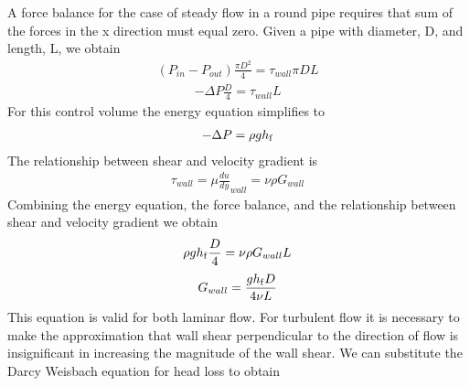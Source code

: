 \documentclass[letterpaper,10pt,english]{sphinxmanual}
\begin{document}
A force balance for the case of steady flow in a round pipe requires that sum of the forces in the x direction must equal zero. Given a pipe with diameter, D, and length, L, we obtain
\begin{equation}\label{equation:Rapid_Mix/RM_Derivations:Rapid_Mix/RM_Derivations:102}
\begin{split}\left(P_{in}- P_{out}\right)\frac{\pi D^2}{4} = \tau_{wall} \pi D L\end{split}
\end{equation}\begin{equation}\label{equation:Rapid_Mix/RM_Derivations:Rapid_Mix/RM_Derivations:103}
\begin{split}-\Delta P\frac{D}{4} = \tau_{wall} L\end{split}
\end{equation}
For this control volume the energy equation simplifies to
\begin{equation}\label{equation:Rapid_Mix/RM_Derivations:Rapid_Mix/RM_Derivations:104}
\begin{split}-\Delta P=\rho g h_{{\rm f}}\end{split}
\end{equation}
The relationship between shear and velocity gradient is
\begin{equation}\label{equation:Rapid_Mix/RM_Derivations:Rapid_Mix/RM_Derivations:105}
\begin{split}\tau_{wall} = \mu \frac{du}{dy}_{wall} = \nu \rho G_{wall}\end{split}
\end{equation}
Combining the energy equation, the force balance, and the relationship between shear and velocity gradient we obtain
\begin{equation}\label{equation:Rapid_Mix/RM_Derivations:Rapid_Mix/RM_Derivations:106}
\begin{split}\rho g h_{{\rm f}}\frac{D}{4} = \nu \rho G_{wall} L\end{split}
\end{equation}\begin{equation}\label{equation:Rapid_Mix/RM_Derivations:Rapid_Mix/RM_Derivations:107}
\begin{split}G_{wall} = \frac{g h_{{\rm f}}D}{4\nu L}\end{split}
\end{equation}
This equation is valid for both laminar flow. For turbulent flow it is necessary to make the approximation that wall shear perpendicular to the direction of flow is insignificant in increasing the magnitude of the wall shear. We can substitute the Darcy Weisbach equation for head loss to obtain
\end{document}
